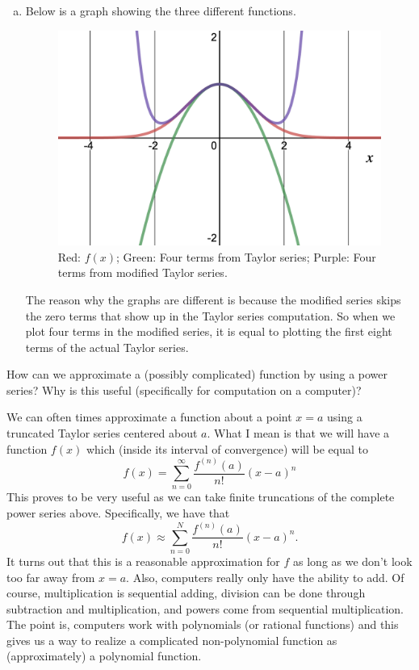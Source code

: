 \documentclass[12pt]{article} %
\begin{document}
\begin{solution}
\begin{enumerate}[(a)]
    \item Below is a graph showing the three different functions.
    \begin{figure}[H]
        \centering
        \includegraphics[width=.8\textwidth]{desmos-graph(4).png}
        \caption{Red: $f(x)$; Green: Four terms from Taylor series; Purple: Four terms from modified Taylor series.}
        \label{fig:my_label}
    \end{figure}
    \begin{remark}
    The reason why the graphs are different is because the modified series skips the zero terms that show up in the Taylor series computation. So when we plot four terms in the modified series, it is equal to plotting the first eight terms of the actual Taylor series.
    \end{remark}
\end{enumerate}
\end{solution}

\newpage
\begin{problem}
How can we approximate a (possibly complicated) function by using a power series? Why is this useful (specifically for computation on a computer)?
\end{problem}
\begin{solution}
We can often times approximate a function about a point $x=a$ using a truncated Taylor series centered about $a$. What I mean is that we will have a function $f(x)$ which (inside its interval of convergence) will be equal to
\[
f(x)=\sum_{n=0}^\infty \frac{f^{(n)}(a)}{n!}(x-a)^n
\]
This proves to be very useful as we can take finite truncations of the complete power series above. Specifically, we have that
\[
f(x)\approx \sum_{n=0}^N \frac{f^{(n)}(a)}{n!}(x-a)^n.
\]
It turns out that this is a reasonable approximation for $f$ as long as we don't look too far away from $x=a$.  Also, computers really only have the ability to add.  Of course, multiplication is sequential adding, division can be done through subtraction and multiplication, and powers come from sequential multiplication.  The point is, computers work with polynomials (or rational functions) and this gives us a way to realize a complicated non-polynomial function as (approximately) a polynomial function.
\end{solution}
\end{document}

